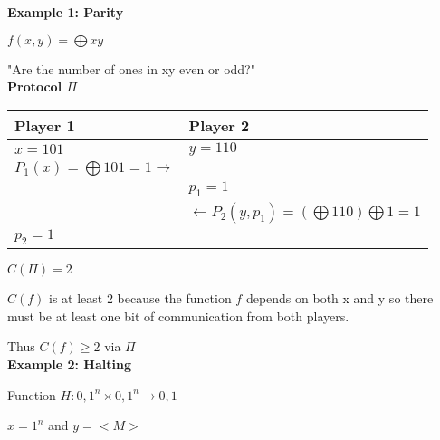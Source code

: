 \documentclass[12pt]{article}
\begin{document}
\maketitle

\textbf{Example 1: Parity}
\\
\par{$f(x, y) =  \bigoplus xy$}
\\

\par{"Are the number of ones in xy even or odd?"}
\\

\textbf{Protocol $\Pi$}
\begin{center}
  \begin{tabular}{ |m{15em}|m{15em}| } 
    \hline
    Player 1                                  & Player 2 \\ [0.5ex] 
    \hline
    $x=101$                                   & $y=110$ \\
    $P_{1}(x)=\bigoplus 101 = 1 \longrightarrow$ &  \\
                                              & $p_{1} = 1$ \\
                                              & $\longleftarrow P_{2}(y, p_{1}) = (\bigoplus 110) \bigoplus 1 = 1$ \\
    $p_{2} = 1$                               & \\
    \hline
  \end{tabular}
\end{center}

\par{$C(\Pi) = 2$}
\\

\par{$C(f)$ is at least 2 because the function $f$ depends on both x and y so there must be at least one bit of communication
from both players.}
\\

\par{Thus $C(f) \geq 2$ via $\Pi$}
\\

\textbf{Example 2: Halting}
\\

\par{Function $H: {0, 1}^{n} \times {0, 1}^{n} \rightarrow {0, 1}$}
\\

\par{$x = 1^{n}$ and $y=<M>$}
\\
\end{document}
